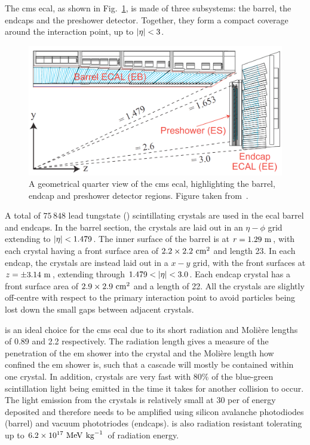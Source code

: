 The \acrshort{cms} \acrshort{ecal}, as shown in Fig.~\ref{fig:CMSECAL}, is made of three subsystems: the barrel, the endcaps and the preshower detector.
Together, they form a compact coverage around the interaction point, up to $\lvert \eta \rvert<3$.
\begin{figure}[htpb]
	\centering
	\includegraphics[width=\textwidth]{Figures/CMSECAL2}
	\caption[A geometrical quarter view of the \acrshort{cms} \acrshort{ecal}, highlighting the barrel, endcap and preshower detector regions.]{A geometrical quarter view of the \acrshort{cms} \acrshort{ecal}, highlighting the barrel, endcap and preshower detector regions. Figure taken from~\cite{CMSTDRV1}.}
	\label{fig:CMSECAL}
\end{figure}
A total of $75\,848$ lead tungstate (\PbWO{}) scintillating crystals are used in the \acrshort{ecal} barrel and endcaps.
In the barrel section, the crystals are laid out in an $\eta-\phi$ grid extending to $\lvert \eta \rvert<1.479$.
The inner surface of the barrel is at $r=1.29\mathrm{~m}^{}$, with each crystal having a front surface area of $2.2\times2.2\mathrm{~cm}^{2}$ and length 23\cm{}.
In each endcap, the crystals are instead laid out in a $x-y$ grid, with the front surfaces at $z=\pm 3.14\mathrm{~m}^{}$, extending through $1.479 < \lvert \eta \rvert < 3.0$. 
Each endcap crystal has a front surface area of $2.9\times2.9\mathrm{~cm}^{2}$ and a length of 22\cm{}.
All the crystals are slightly off-centre with respect to the primary interaction point to avoid particles being lost down the small gaps between adjacent crystals.

\PbWO{} is an ideal choice for the \acrshort{cms} \acrshort{ecal} due to its short radiation and Moli\`ere lengths of 0.89 and 2.2\cm{} respectively. 
The radiation length gives a measure of the penetration of the \acrshort{em} shower into the crystal and the Moli\`ere length how confined the \acrshort{em} shower is, such that a cascade will mostly be contained within one crystal. 
In addition, \PbWO{} crystals are very fast with 80\% of the blue-green scintillation light being emitted in the time it takes for another collision to occur.
The light emission from the \PbWO{} crystals is relatively small at 30\photon{} per\MeV{} of energy deposited and therefore needs to be amplified using silicon avalanche photodiodes (barrel) and vacuum phototriodes (endcaps).
\PbWO{} is also radiation resistant tolerating up to $6.2\times \text{10}^\text{17}\mathrm{~Me\hspace{-.08em}V}^{}\mathrm{~kg}^{-1}$ of radiation energy.

